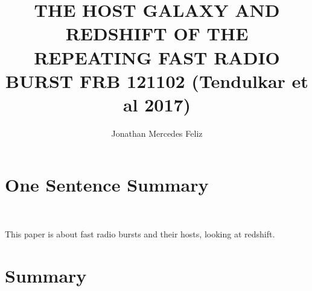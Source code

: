 \documentclass{article}
\title{THE HOST GALAXY AND REDSHIFT OF THE REPEATING FAST RADIO BURST FRB 121102 (Tendulkar et al 2017)}
\author{Jonathan Mercedes Feliz}
\begin{document}
 
\maketitle{}
\section{One Sentence Summary} 
\
\par This paper is about fast radio bursts and their hosts, looking at redshift.
\section{Summary}
\
\par  
\end{document}
